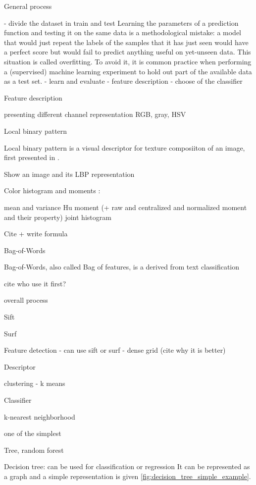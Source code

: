 General process

- divide the dataset in train and test
Learning the parameters of a prediction function and testing it on the same data is a methodological mistake: a model that would just repeat the labels of the samples that it has just seen would have a perfect score but would fail to predict anything useful on yet-unseen data. This situation is called overfitting. To avoid it, it is common practice when performing a (supervised) machine learning experiment to hold out part of the available data as a test set.
- learn and evaluate
- feature description
- choose of the classifier

Feature description

presenting different channel representation
RGB, gray, HSV

Local binary pattern

Local binary pattern is a visual descriptor for texture composiiton of an image, first presented in .

Show an image and its LBP representation



Color histogram and moments :

mean and variance
Hu moment (+ raw and centralized and normalized moment and their property)
joint histogram

Cite + write formula

Bag-of-Words

Bag-of-Words, also called Bag of features, is a 
derived from text classification

cite who use it first?

overall process

Sift

Surf

Feature detection
- can use sift or surf
- dense grid (cite why it is better)

Descriptor

clustering
- k means

Classifier

k-nearest neighborhood

one of the simplest

Tree, random forest

Decision tree: can be used for classification or regression
It can be represented as a graph and a simple representation is given \ref{fig:decision_tree_simple_example}.

